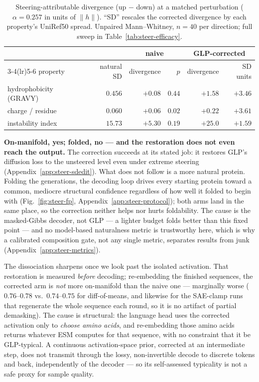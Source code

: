 \documentclass{article}
\begin{document}
\begin{table}[t]
\centering
\caption{Steering-attributable divergence (up $-$ down) at a matched perturbation
($\alpha{=}0.257$ in units of $\lVert h\rVert$). ``SD'' rescales the corrected divergence by each
property's UniRef50 spread. Unpaired Mann--Whitney, $n{=}40$ per direction; full sweep in
Table~\ref{tab:steer-efficacy}.}
\label{tab:steer-div}
\begin{tabular}{lrrrrr}
\toprule
& & \multicolumn{2}{c}{naive} & \multicolumn{2}{c}{GLP-corrected} \\
\cmidrule(lr){3-4}\cmidrule(lr){5-6}
property & natural SD & divergence & $p$ & divergence & SD units \\
\midrule
hydrophobicity (GRAVY)   & $0.456$  & $+0.08$  & $0.44$ & $+1.58$  & $+3.46$ \\
charge / residue         & $0.060$  & $+0.06$  & $0.02$ & $+0.22$  & $+3.61$ \\
instability index        & $15.73$  & $+5.30$  & $0.19$ & $+25.0$  & $+1.59$ \\
\bottomrule
\end{tabular}
\end{table}

\textbf{On-manifold, yes; folded, no --- and the restoration does not even reach the output.}
The correction succeeds at its stated job: it restores GLP's diffusion loss to the unsteered
level even under extreme steering (Appendix~\ref{app:steer-sdedit}). What does not follow is a
more natural protein. Folding the generations, the decoding loop drives every starting protein
toward a common, mediocre structural confidence regardless of how well it folded to begin with
(Fig.~\ref{fig:steer-fp}, Appendix~\ref{app:steer-protocol}); both arms land in the same place,
so the correction neither helps nor hurts foldability. The cause is the masked-Gibbs decoder,
not GLP --- a lighter budget folds better than this fixed point --- and no model-based
naturalness metric is trustworthy here, which is why a calibrated composition gate, not any
single metric, separates results from junk (Appendix~\ref{app:steer-metrics}).

The dissociation sharpens once we look past the isolated activation. That restoration is
measured \emph{before} decoding; re-embedding the finished sequences, the corrected arm is
\emph{not} more on-manifold than the naive one --- marginally worse ($0.76$--$0.78$ vs.\
$0.74$--$0.75$ for diff-of-means, and likewise for the SAE-clamp runs that regenerate the whole
sequence each round, so it is no artifact of partial demasking). The cause is structural: the
language head uses the corrected activation only to \emph{choose amino acids}, and re-embedding
those amino acids returns whatever ESM computes for that sequence, with no constraint that it be
GLP-typical. A continuous activation-space prior, corrected at an intermediate step, does not
transmit through the lossy, non-invertible decode to discrete tokens and back, independently of
the decoder --- so its self-assessed typicality is not a safe proxy for sample quality.
\end{document}

